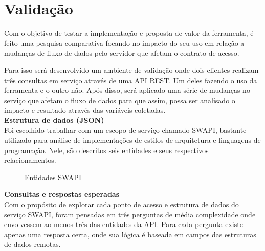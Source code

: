 \section{Validação}

Com o objetivo de testar a implementação e proposta de valor da ferramenta, é feito uma pesquisa comparativa focando no impacto do seu uso em relação a mudanças de fluxo de dados pelo servidor que afetam o contrato de acesso.

Para isso será desenvolvido um ambiente de validação onde dois clientes realizam três consultas em serviço através de uma API REST. Um deles fazendo o uso da ferramenta e o outro não. Após disso, será aplicado uma série de mudanças no serviço que afetam o fluxo de dados para que assim, possa ser analisado o impacto e resultado através das  variáveis coletadas. \\

\textbf{Estrutura de dados (JSON)} \\

Foi escolhido trabalhar com um escopo de serviço chamado SWAPI, bastante utilizado para análise de implementações de estilos de arquitetura e linguagens de programação. Nele, são descritos seis entidades e seus respectivos relacionamentos.

\begin{figure}[H]
  \centering
  \caption{Entidades SWAPI}
\end{figure}

\textbf{Consultas e respostas esperadas} \\

Com o propósito de explorar cada ponto de acesso e estrutura de dados do serviço SWAPI, foram pensadas em três perguntas de média complexidade onde envolvessem ao menos três das entidades da API. Para cada pergunta existe apenas uma resposta certa, onde sua lógica é baseada em campos das estruturas de dados remotas.

